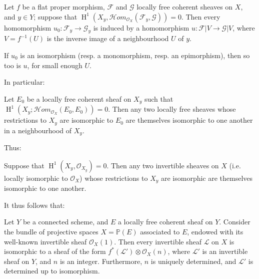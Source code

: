 \begin{theorem}\label{fga2-theorem-7}
    Let $f$ be a flat proper morphism, $\mathcal{F}$ and $\mathcal{G}$ locally free coherent sheaves on $X$, and $y\in Y$;
    suppose that $\operatorname{H}^1(X_y,\mathcal{H}om_{\mathcal{O}_X}(\mathcal{F}_y,\mathcal{G}))=0$.
    Then every homomorphism $u_0\colon\mathcal{F}_y\to\mathcal{G}_y$ is induced by a homomorphism $u\colon\mathcal{F}|V\to\mathcal{G}|V$, where $V=f^{-1}(U)$ is the inverse image of a neighbourhood $U$ of $y$.
\end{theorem}

\begin{corollary}\label{fga2-theorem-7-corollary-1}
    If $u_0$ is an isomorphism (resp. a monomorphism, resp. an epimorphism), then so too is $u$, for small enough $U$.
\end{corollary}

In particular:

\begin{corollary}\label{fga2-theorem-7-corollary-2}
    Let $E_0$ be a locally free coherent sheaf on $X_y$ such that $\operatorname{H}^1(X_y;\mathcal{H}om_{\mathcal{O}_X}(E_0,E_0))=0$.
    Then any two locally free sheaves whose restrictions to $X_y$ are isomorphic to $E_0$ are themselves isomorphic to one another in a neighbourhood of $X_y$.
\end{corollary}

Thus:

\begin{corollary}\label{fga2-theorem-7-corollary-3}
    Suppose that $\operatorname{H}^1(X_y,\mathcal{O}_{X_y})=0$.
    Then any two invertible sheaves on $X$ (i.e. locally isomorphic to $\mathcal{O}_X$) whose restrictions to $X_y$ are isomorphic are themselves isomorphic to one another.
\end{corollary}

It thus follows that:

\begin{proposition}\label{fga2-proposition-2}
    Let $Y$ be a connected scheme, and $E$ a locally free coherent sheaf on $Y$.
    Consider the bundle of projective spaces $X=\mathbb{P}(E)$ associated to $E$, endowed with its well-known invertible sheaf $\mathcal{O}_X(1)$.
    Then every invertible sheaf $\mathcal{L}$ on $X$ is isomorphic to a sheaf of the form $f^*(\mathcal{L}')\otimes\mathcal{O}_X(n)$, where $\mathcal{L}'$ is an invertible sheaf on $Y$, and $n$ is an integer.
    Furthermore, $n$ is uniquely determined, and $\mathcal{L}'$ is determined up to isomorphism.
\end{proposition}

